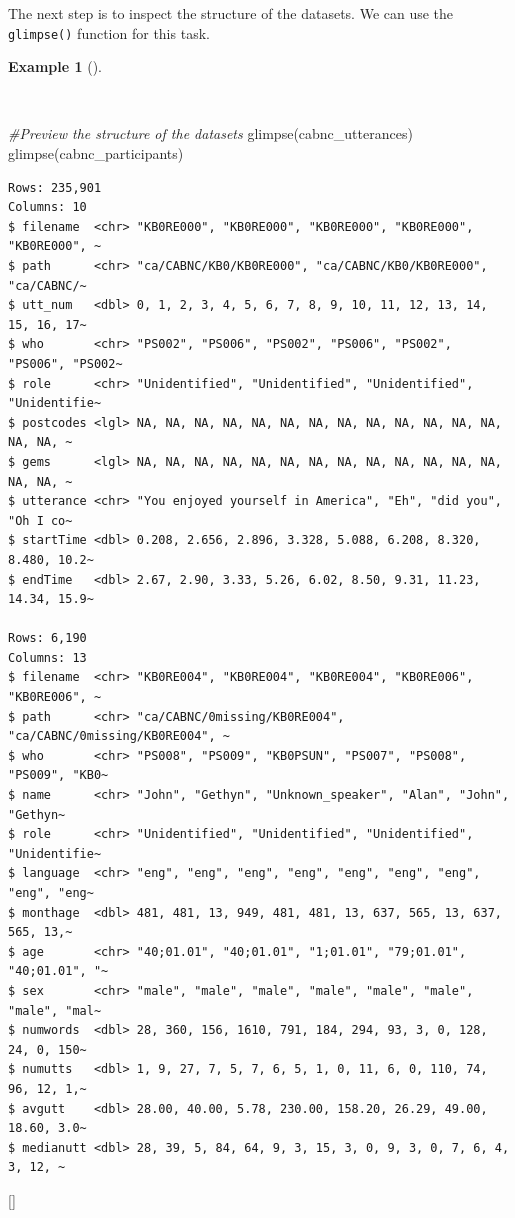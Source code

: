 \documentclass[
  letterpaper,
  krantz1]{latex/krantz-mod}
\newenvironment{Shaded}{\begin{snugshade}}{\end{snugshade}}
\newcommand{\CommentTok}[1]{\textcolor[rgb]{0.00,0.00,0.00}{\textit{#1}}}
\newcommand{\FunctionTok}[1]{\textcolor[rgb]{0.00,0.00,0.00}{#1}}
\newcommand{\NormalTok}[1]{\textcolor[rgb]{0.00,0.00,0.00}{#1}}
\newcommand{\cindex}[1]{%
  \StrSubstitute{#1}{_}{\_}[\temp]%
  \index{\temp}%
}
\theoremstyle{definition}
\theoremstyle{definition}
\newtheorem{example}{Example}[chapter]
\theoremstyle{remark}
\begin{document}
The next step is to inspect the structure of the datasets. We can use
the \texttt{glimpse()} function for this task.

\begin{example}[]\protect\hypertarget{exm-curate-cabnc-glimpse}{}\label{exm-curate-cabnc-glimpse}

~

\begin{Shaded}
\begin{Highlighting}[numbers=left,,]
\CommentTok{\#Preview the structure of the datasets}
\FunctionTok{glimpse}\NormalTok{(cabnc\_utterances)}
\FunctionTok{glimpse}\NormalTok{(cabnc\_participants)}
\end{Highlighting}
\end{Shaded}

\begin{verbatim}
Rows: 235,901
Columns: 10
$ filename  <chr> "KB0RE000", "KB0RE000", "KB0RE000", "KB0RE000", "KB0RE000", ~
$ path      <chr> "ca/CABNC/KB0/KB0RE000", "ca/CABNC/KB0/KB0RE000", "ca/CABNC/~
$ utt_num   <dbl> 0, 1, 2, 3, 4, 5, 6, 7, 8, 9, 10, 11, 12, 13, 14, 15, 16, 17~
$ who       <chr> "PS002", "PS006", "PS002", "PS006", "PS002", "PS006", "PS002~
$ role      <chr> "Unidentified", "Unidentified", "Unidentified", "Unidentifie~
$ postcodes <lgl> NA, NA, NA, NA, NA, NA, NA, NA, NA, NA, NA, NA, NA, NA, NA, ~
$ gems      <lgl> NA, NA, NA, NA, NA, NA, NA, NA, NA, NA, NA, NA, NA, NA, NA, ~
$ utterance <chr> "You enjoyed yourself in America", "Eh", "did you", "Oh I co~
$ startTime <dbl> 0.208, 2.656, 2.896, 3.328, 5.088, 6.208, 8.320, 8.480, 10.2~
$ endTime   <dbl> 2.67, 2.90, 3.33, 5.26, 6.02, 8.50, 9.31, 11.23, 14.34, 15.9~

Rows: 6,190
Columns: 13
$ filename  <chr> "KB0RE004", "KB0RE004", "KB0RE004", "KB0RE006", "KB0RE006", ~
$ path      <chr> "ca/CABNC/0missing/KB0RE004", "ca/CABNC/0missing/KB0RE004", ~
$ who       <chr> "PS008", "PS009", "KB0PSUN", "PS007", "PS008", "PS009", "KB0~
$ name      <chr> "John", "Gethyn", "Unknown_speaker", "Alan", "John", "Gethyn~
$ role      <chr> "Unidentified", "Unidentified", "Unidentified", "Unidentifie~
$ language  <chr> "eng", "eng", "eng", "eng", "eng", "eng", "eng", "eng", "eng~
$ monthage  <dbl> 481, 481, 13, 949, 481, 481, 13, 637, 565, 13, 637, 565, 13,~
$ age       <chr> "40;01.01", "40;01.01", "1;01.01", "79;01.01", "40;01.01", "~
$ sex       <chr> "male", "male", "male", "male", "male", "male", "male", "mal~
$ numwords  <dbl> 28, 360, 156, 1610, 791, 184, 294, 93, 3, 0, 128, 24, 0, 150~
$ numutts   <dbl> 1, 9, 27, 7, 5, 7, 6, 5, 1, 0, 11, 6, 0, 110, 74, 96, 12, 1,~
$ avgutt    <dbl> 28.00, 40.00, 5.78, 230.00, 158.20, 26.29, 49.00, 18.60, 3.0~
$ medianutt <dbl> 28, 39, 5, 84, 64, 9, 3, 15, 3, 0, 9, 3, 0, 7, 6, 4, 3, 12, ~
\end{verbatim}

\cindex{glimpse()}

\end{example}
\end{document}
